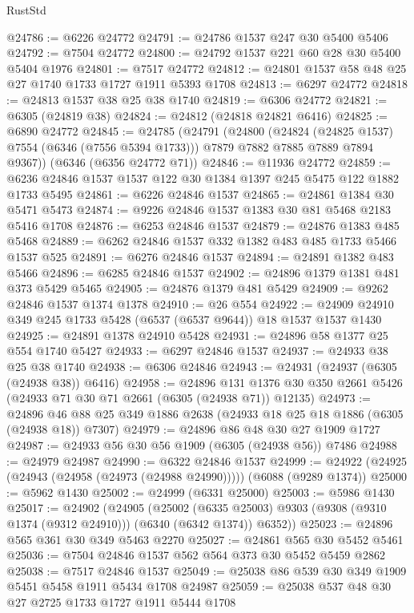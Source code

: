 \begin{lexlean}{RustStd}
\begin{coremodule}
@24786 := @6226 @24772
@24791 := @24786 @1537 @247 @30 @5400 @5406
@24792 := @7504 @24772
@24800 := @24792 @1537 @221 @60 @28 @30 @5400 @5404 @1976
@24801 := @7517 @24772
@24812 := @24801 @1537 @58 @48 @25 @27 @1740 @1733 @1727 @1911 @5393 @1708
@24813 := @6297 @24772
@24818 := @24813 @1537 @38 @25 @38 @1740
@24819 := @6306 @24772
@24821 := @6305 (@24819 @38)
@24824 := @24812 (@24818 @24821 @6416)
@24825 := @6890 @24772
@24845 := @24785
    (@24791
      (@24800
        (@24824 (@24825 @1537) @7554 (@6346 (@7556 @5394 @1733)))
        @7879
        @7882
        @7885
        @7889
        @7894
        @9367))
    (@6346 (@6356 @24772 @71))
@24846 := @11936 @24772
@24859 := @6236 @24846 @1537 @1537 @122 @30 @1384 @1397 @245 @5475 @122 @1882 @1733 @5495
@24861 := @6226 @24846 @1537
@24865 := @24861 @1384 @30 @5471 @5473
@24874 := @9226 @24846 @1537 @1383 @30 @81 @5468 @2183 @5416 @1708
@24876 := @6253 @24846 @1537
@24879 := @24876 @1383 @485 @5468
@24889 := @6262 @24846 @1537 @332 @1382 @483 @485 @1733 @5466 @1537 @525
@24891 := @6276 @24846 @1537
@24894 := @24891 @1382 @483 @5466
@24896 := @6285 @24846 @1537
@24902 := @24896 @1379 @1381 @481 @373 @5429 @5465
@24905 := @24876 @1379 @481 @5429
@24909 := @9262 @24846 @1537 @1374 @1378
@24910 := @26 @554
@24922 := @24909 @24910 @349 @245 @1733 @5428 (@6537 (@6537 @9644)) @18 @1537 @1537 @1430
@24925 := @24891 @1378 @24910 @5428
@24931 := @24896 @58 @1377 @25 @554 @1740 @5427
@24933 := @6297 @24846 @1537
@24937 := @24933 @38 @25 @38 @1740
@24938 := @6306 @24846
@24943 := @24931 (@24937 (@6305 (@24938 @38)) @6416)
@24958 := @24896
    @131
    @1376
    @30
    @350
    @2661
    @5426
    (@24933 @71 @30 @71 @2661 (@6305 (@24938 @71)) @12135)
@24973 := @24896 @46 @88 @25 @349 @1886 @2638 (@24933 @18 @25 @18 @1886 (@6305 (@24938 @18)) @7307)
@24979 := @24896 @86 @48 @30 @27 @1909 @1727
@24987 := @24933 @56 @30 @56 @1909 (@6305 (@24938 @56)) @7486
@24988 := @24979 @24987
@24990 := @6322 @24846 @1537
@24999 := @24922 (@24925 (@24943 (@24958 (@24973 (@24988 @24990))))) (@6088 (@9289 @1374))
@25000 := @5962 @1430
@25002 := @24999 (@6331 @25000)
@25003 := @5986 @1430
@25017 := @24902
    (@24905
      (@25002
        (@6335 @25003)
        @9303
        (@9308 (@9310 @1374 (@9312 @24910)))
        (@6340 (@6342 @1374))
        @6352))
@25023 := @24896 @565 @361 @30 @349 @5463 @2270
@25027 := @24861 @565 @30 @5452 @5461
@25036 := @7504 @24846 @1537 @562 @564 @373 @30 @5452 @5459 @2862
@25038 := @7517 @24846 @1537
@25049 := @25038 @86 @539 @30 @349 @1909 @5451 @5458 @1911 @5434 @1708 @24987
@25059 := @25038 @537 @48 @30 @27 @2725 @1733 @1727 @1911 @5444 @1708

\end{coremodule}
\end{lexlean}
